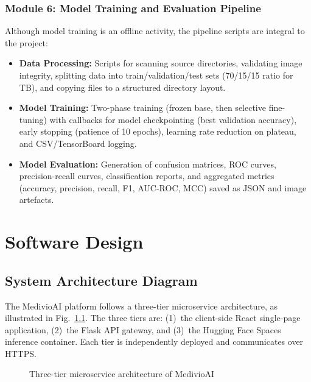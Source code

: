 \documentclass[12pt, a4paper, oneside]{report}
\begin{document}
\subsection{Module 6: Model Training and Evaluation Pipeline}
\label{subsec:mod_training}

Although model training is an offline activity, the pipeline scripts are integral to the project:

\begin{itemize}
    \item \textbf{Data Processing:} Scripts for scanning source directories, validating image integrity, splitting data into train/validation/test sets (70/15/15 ratio for TB), and copying files to a structured directory layout.
    \item \textbf{Model Training:} Two-phase training (frozen base, then selective fine-tuning) with callbacks for model checkpointing (best validation accuracy), early stopping (patience of 10 epochs), learning rate reduction on plateau, and CSV/TensorBoard logging.
    \item \textbf{Model Evaluation:} Generation of confusion matrices, ROC curves, precision-recall curves, classification reports, and aggregated metrics (accuracy, precision, recall, F1, AUC-ROC, MCC) saved as JSON and image artefacts.
\end{itemize}

\chapter{Software Design}
\label{chap:design}

\section{System Architecture Diagram}
\label{sec:architecture}

The MedivioAI platform follows a three-tier microservice architecture, as illustrated in Fig.~\ref{fig:system_arch}. The three tiers are: (1)~the client-side React single-page application, (2)~the Flask API gateway, and (3)~the Hugging Face Spaces inference container. Each tier is independently deployed and communicates over HTTPS.

\begin{figure}[H]
\centering
{}
\caption{Three-tier microservice architecture of MedivioAI}
\label{fig:system_arch}
\end{figure}
\end{document}
